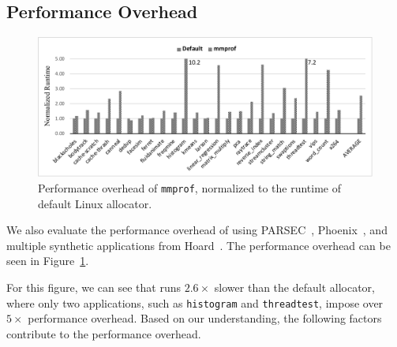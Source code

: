  








\subsection{Performance Overhead}
\label{sec:perf}

\begin{figure}[!ht]
\centering
\includegraphics[width=5.5in]{figures/perfoverhead}
\caption{Performance overhead of \texttt{mmprof}, normalized to the runtime of default Linux allocator.\label{fig:overhead}}
\end{figure}

We also evaluate the performance overhead of 
\MP{} using PARSEC~\citep{parsec},  Phoenix~\citep{phoenix}, and multiple synthetic applications from Hoard~\cite{Hoard}. The performance overhead can be seen in Figure~\ref{fig:overhead}. 

For this figure, we can see that \MP{} runs $2.6\times$ slower than the default allocator, where only two applications, such as \texttt{histogram} and \texttt{threadtest}, impose over $5\times$ performance overhead. Based on our understanding, the following factors contribute to the performance overhead. 

